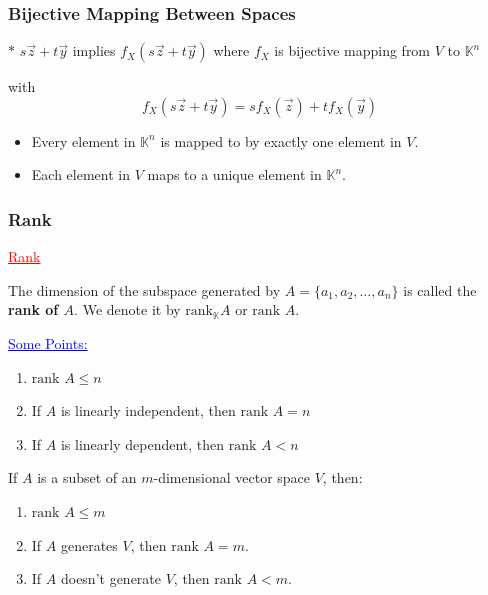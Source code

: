 \documentclass[aspectratio=169,xcolor=dvipsnames,svgnames,x11names,fleqn]{beamer}
\begin{document}
\begin{frame}
\frametitle{Bijective Mapping Between Spaces}

$\ast$ $s\vec{z} + t\vec{y}$ implies $f_X(s\vec{z} + t\vec{y})$ where $f_X$ is bijective mapping from $V$ to $\mathbb{K}^n$

with 
$$f_X(s\vec{z} + t\vec{y}) = sf_X(\vec{z}) + tf_X(\vec{y})$$

\vspace{0.5cm}

\begin{tcolorbox}[colback=androidRedLight,colframe=red!50!black,title=Bijective mapping refresher:]
\begin{itemize}
    \item Every element in $\mathbb{K}^n$ is mapped to by exactly one element in $V$.
    \item Each element in $V$ maps to a unique element in $\mathbb{K}^n$.
\end{itemize}
\end{tcolorbox}

\end{frame}

\begin{frame}
\frametitle{Rank}

\textcolor{red}{\underline{Rank}}

The dimension of the subspace generated by $A = \{a_1, a_2, \ldots, a_n\}$ is called the \textbf{rank of $A$}. We denote it by $\text{rank}_\mathbb{K} A$ or $\text{rank } A$.

\vspace{0.5cm}

\textcolor{blue}{\underline{Some Points:}}
\begin{enumerate}
    \item $\text{rank } A \leq n$
    
    \item If $A$ is linearly independent, then $\text{rank } A = n$
    
    \item If $A$ is linearly dependent, then $\text{rank } A < n$
\end{enumerate}

\vspace{0.5cm}

If $A$ is a subset of an $m$-dimensional vector space $V$, then:
\begin{enumerate}
    \item $\text{rank } A \leq m$
    
    \item If $A$ generates $V$, then $\text{rank } A = m$.
    
    \item If $A$ doesn't generate $V$, then $\text{rank } A < m$.
\end{enumerate}

\end{frame}
\end{document}
